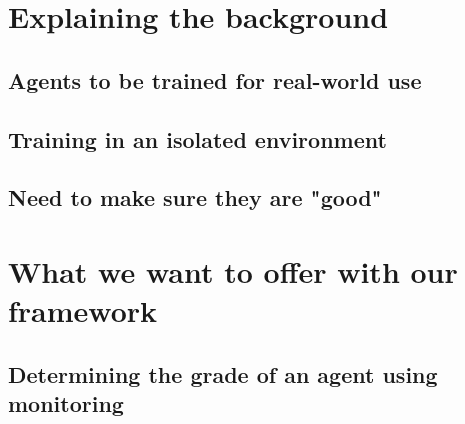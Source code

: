\section{Explaining the background}
\subsection{Agents to be trained for real-world use}
\subsection{Training in an isolated environment}
\subsection{Need to make sure they are "good"}
\section{What we want to offer with our framework}
\subsection{Determining the grade of an agent using monitoring}